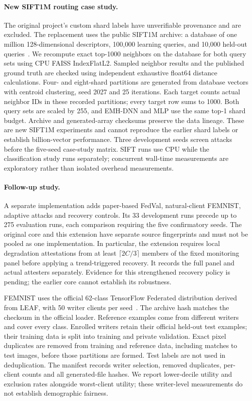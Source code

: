 \paragraph{New SIFT1M routing case study.}
The original project's custom shard labels have unverifiable provenance and
are excluded. The replacement uses the public SIFT1M archive: a database of
one million 128-dimensional descriptors, 100,000 learning queries, and 10,000
held-out queries~\cite{faisssift}. We recompute exact top-1000 neighbors on the
database for both query sets using CPU FAISS IndexFlatL2. Sampled neighbor results
and the published ground truth are checked using independent exhaustive
float64 distance calculations. Four- and eight-shard partitions are generated
from database vectors with centroid clustering, seed 2027 and 25 iterations.
Each target counts actual neighbor IDs in these recorded partitions; every
target row sums to 1000. Both query sets are scaled by 255, and EMH-DNN and MLP
use the same top-1 shard budget. Archive and generated-array checksums preserve
the data lineage. These are new SIFT1M experiments and cannot reproduce the
earlier shard labels or establish billion-vector performance. Three development
seeds screen attacks before the five-seed case-study matrix. SIFT runs use CPU
while the classification study runs separately; concurrent wall-time measurements
are exploratory rather than isolated overhead measurements.

\paragraph{Follow-up study.}
A separate implementation adds paper-based FedVal, natural-client FEMNIST,
adaptive attacks and recovery controls. Its 33 development runs precede up to
275 evaluation runs, each comparison requiring the five confirmatory seeds.
The original core and this extension have separate source fingerprints and
must not be pooled as one implementation. In particular, the extension requires
local degradation attestations from at least $\lceil2C/3\rceil$ members of the
fixed monitoring panel before applying a trend-triggered recovery. It records
the full panel and actual attesters separately. Evidence for this strengthened
recovery policy is pending; the earlier core cannot establish its robustness.

FEMNIST uses the official 62-class TensorFlow Federated distribution derived
from LEAF, with 50 writer clients per seed~\cite{tfffemnist}. The archive hash
matches the checksum in the official loader. Reference examples come from
different writers and cover every class. Enrolled writers retain their official
held-out test examples; their training data is split into training and private
validation. Exact pixel duplicates are removed from training and reference data,
including matches to test images, before those partitions are formed. Test
labels are not used in deduplication. The manifest records writer selection,
removed duplicates, per-client counts and all generated-file hashes. We report
lower-decile utility and exclusion rates alongside worst-client utility; these
writer-level measurements do not establish demographic fairness.

